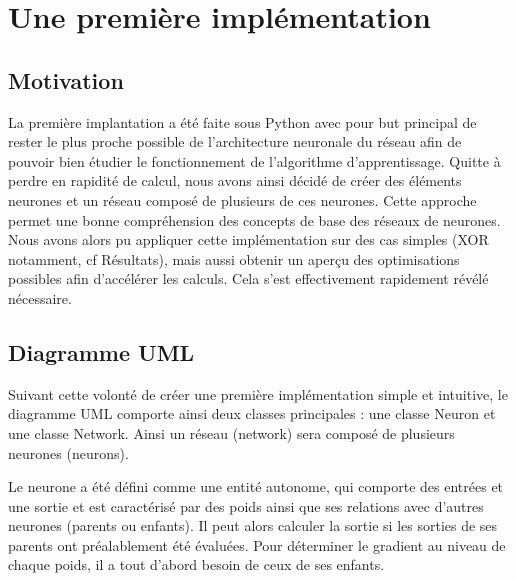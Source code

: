 \documentclass{report}
\theoremstyle{plain}
\theoremstyle{definition}
\theoremstyle{remark}
\begin{document}


\chapter{Une première implémentation}

\section{Motivation}

La première implantation a été faite sous Python avec pour but principal de rester le plus proche possible de l'architecture neuronale du réseau afin de pouvoir bien étudier le fonctionnement de l'algorithme d'apprentissage. Quitte à perdre en rapidité de calcul, nous avons ainsi décidé de créer des éléments neurones et un réseau composé de plusieurs de ces neurones. Cette approche permet une bonne compréhension des concepts de base des réseaux de neurones. Nous avons alors pu appliquer cette implémentation sur des cas simples (XOR notamment, cf Résultats), mais aussi obtenir un aperçu des optimisations possibles afin d'accélérer les calculs. Cela s'est effectivement rapidement révélé nécessaire.  

\section{Diagramme UML}

Suivant cette volonté de créer une première implémentation simple et intuitive, le diagramme UML comporte ainsi deux classes principales : une classe Neuron et une classe Network. Ainsi un réseau (network) sera composé de plusieurs neurones (neurons).

Le neurone a été défini comme une entité autonome, qui comporte des entrées et une sortie et est caractérisé par des poids ainsi que ses relations avec d'autres neurones (parents ou enfants). Il peut alors calculer la sortie si les sorties de ses parents ont préalablement été évaluées. Pour déterminer le gradient au niveau de chaque poids, il a tout d'abord besoin de ceux de ses enfants.
\end{document}
